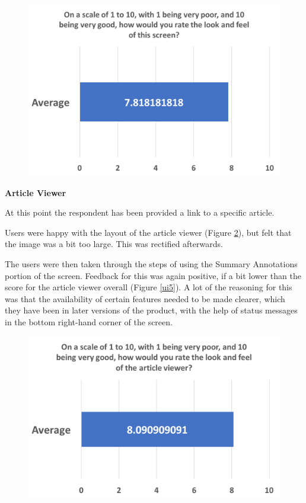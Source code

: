 \documentclass[12pt]{article}
\begin{document}
\begin{figure}[ht!]
  \centering
    \includegraphics[scale=0.6]{ui3.png}
   \caption[A graph depicting responses to the User Interface Survey]{}
   \label{ui3}
\end{figure} 

\textbf{Article Viewer}

At this point the respondent has been provided a link to a specific article. 

Users were happy with the layout of the article viewer (Figure \ref{ui4}), but felt that the image was a bit too large. This was rectified afterwards.

The users were then taken through the steps of using the Summary Annotations portion of the screen. Feedback for this was again positive, if a bit lower than the score for the article viewer overall (Figure \ref{ui5}). A lot of the reasoning for this was that the availability of certain features needed to be made clearer, which they have been in later versions of the product, with the help of status messages in the bottom right-hand corner of the screen. \\

\begin{figure}[ht!]
  \centering
    \includegraphics[scale=0.6]{ui4.png}
   \caption[A graph depicting responses to the User Interface Survey]{}
   \label{ui4}
\end{figure} 
\end{document}
